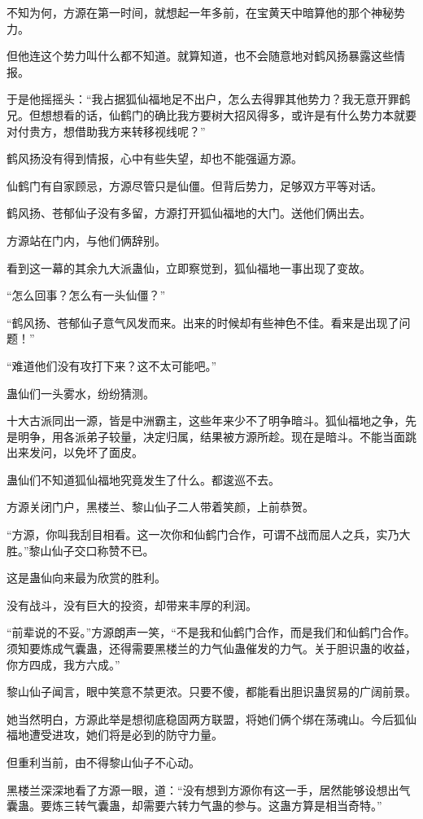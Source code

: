 \begin{this_body}
不知为何，方源在第一时间，就想起一年多前，在宝黄天中暗算他的那个神秘势力。

但他连这个势力叫什么都不知道。就算知道，也不会随意地对鹤风扬暴露这些情报。

于是他摇摇头：“我占据狐仙福地足不出户，怎么去得罪其他势力？我无意开罪鹤兄。但想想看的话，仙鹤门的确比我方要树大招风得多，或许是有什么势力本就要对付贵方，想借助我方来转移视线呢？”

鹤风扬没有得到情报，心中有些失望，却也不能强逼方源。

仙鹤门有自家顾忌，方源尽管只是仙僵。但背后势力，足够双方平等对话。

鹤风扬、苍郁仙子没有多留，方源打开狐仙福地的大门。送他们俩出去。

方源站在门内，与他们俩辞别。

看到这一幕的其余九大派蛊仙，立即察觉到，狐仙福地一事出现了变故。

“怎么回事？怎么有一头仙僵？”

“鹤风扬、苍郁仙子意气风发而来。出来的时候却有些神色不佳。看来是出现了问题！”

“难道他们没有攻打下来？这不太可能吧。”

蛊仙们一头雾水，纷纷猜测。

十大古派同出一源，皆是中洲霸主，这些年来少不了明争暗斗。狐仙福地之争，先是明争，用各派弟子较量，决定归属，结果被方源所趁。现在是暗斗。不能当面跳出来发问，以免坏了面皮。

蛊仙们不知道狐仙福地究竟发生了什么。都逡巡不去。

方源关闭门户，黑楼兰、黎山仙子二人带着笑颜，上前恭贺。

“方源，你叫我刮目相看。这一次你和仙鹤门合作，可谓不战而屈人之兵，实乃大胜。”黎山仙子交口称赞不已。

这是蛊仙向来最为欣赏的胜利。

没有战斗，没有巨大的投资，却带来丰厚的利润。

“前辈说的不妥。”方源朗声一笑，“不是我和仙鹤门合作，而是我们和仙鹤门合作。须知要炼成气囊蛊，还得需要黑楼兰的力气仙蛊催发的力气。关于胆识蛊的收益，你方四成，我方六成。”

黎山仙子闻言，眼中笑意不禁更浓。只要不傻，都能看出胆识蛊贸易的广阔前景。

她当然明白，方源此举是想彻底稳固两方联盟，将她们俩个绑在荡魂山。今后狐仙福地遭受进攻，她们将是必到的防守力量。

但重利当前，由不得黎山仙子不心动。

黑楼兰深深地看了方源一眼，道：“没有想到方源你有这一手，居然能够设想出气囊蛊。要炼三转气囊蛊，却需要六转力气蛊的参与。这蛊方算是相当奇特。”


\end{this_body}
